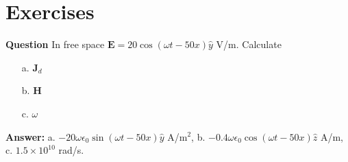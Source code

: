 \documentclass[12pt,a4paper]{article}
\begin{document}
\section{Exercises}
\noindent\textbf{Question} In free space $\mathrm{\textbf{E}}=20\cos\left(\omega t-50x\right)\hat y$ V/m. Calculate
\begin{itemize}
\item[a.] \textbf{J}$_d$
\item[b.] \textbf{H}
\item[c.] $\omega$
\end{itemize}
\noindent\textbf{Answer: } a. $-20\omega\epsilon_0\sin\left(\omega t-50x\right)\hat y$ A/m$^2$, b. $-0.4\omega\epsilon_0\cos\left(\omega t-50x\right)\hat z$ A/m, c. $1.5\times10^{10}$ rad/s.


\end{document}
